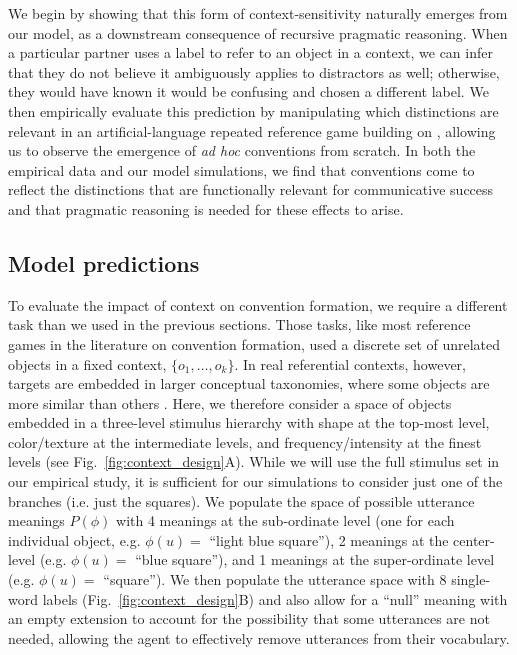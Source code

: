 We begin by showing that this form of context-sensitivity naturally emerges from our model, as a downstream consequence of recursive pragmatic reasoning.
When a particular partner uses a label to refer to an object in a context, we can infer that they do not believe it ambiguously applies to distractors as well; otherwise, they would have known it would be confusing and chosen a different label.
We then empirically evaluate this prediction by manipulating which distinctions are relevant in an artificial-language repeated reference game building on , allowing us to observe the emergence of \emph{ad hoc} conventions from scratch.
In both the empirical data and our model simulations, we find that conventions come to reflect the distinctions that are functionally relevant for communicative success and that pragmatic reasoning is needed for these effects to arise. 

\subsection{Model predictions}

To evaluate the impact of context on convention formation, we require a different task than we used in the previous sections.
Those tasks, like most reference games in the literature on convention formation, used a discrete set of unrelated objects in a fixed context, $\{o_1, \dots, o_k\}$. 
In real referential contexts, however, targets are embedded in larger conceptual taxonomies, where some objects are more similar than others \cite{bruner1956study,collins1969retrieval,XuTenenbaum07_WordLearningBayesian}.
Here, we therefore consider a space of objects embedded in a three-level stimulus hierarchy with shape at the top-most level, color/texture at the intermediate levels, and frequency/intensity at the finest levels (see Fig.~\ref{fig:context_design}A). 
While we will use the full stimulus set in our empirical study, it is sufficient for our simulations to consider just one of the branches (i.e. just the squares).
We populate the space of possible utterance meanings $P(\phi)$ with 4 meanings at the sub-ordinate level (one for each individual object, e.g. $\phi(u) =$ ``light blue square''), 2 meanings at the center-level (e.g. $\phi(u) =$ ``blue square''), and 1 meanings at the super-ordinate level (e.g. $\phi(u) =$ ``square'').
We then populate the utterance space with 8 single-word labels (Fig.~\ref{fig:context_design}B) and also allow for a ``null'' meaning with an empty extension to account for the possibility that some utterances are not needed, allowing the agent to effectively remove utterances from their vocabulary.

